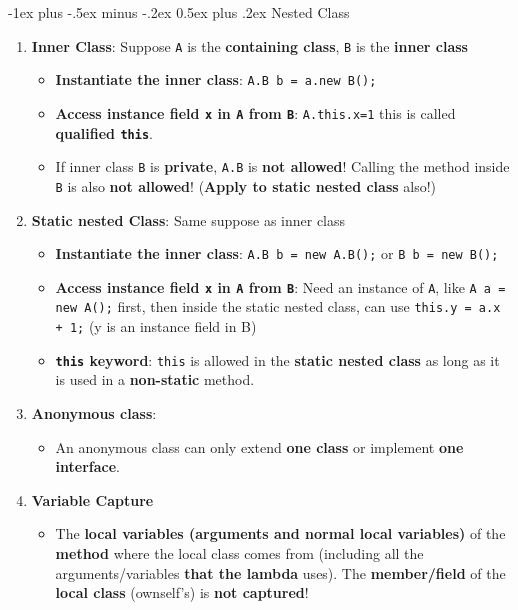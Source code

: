 \documentclass[10pt, landscape]{article}
\makeatletter
\renewcommand{\section}{\@startsection{section}{1}{0mm}%
                                {-1ex plus -.5ex minus -.2ex}%
                                {0.5ex plus .2ex}%
                                {\normalfont\large\bfseries}}
\makeatother
\begin{document}
\begin{multicols}{4}
\section{Nested Class}
\begin{enumerate}
    \item \textbf{Inner Class}: Suppose \texttt{A} is the \textbf{containing class}, \texttt{B} is the \textbf{inner class}
    \begin{itemize}
        \item \textbf{Instantiate the inner class}: \texttt{A.B b = a.new B();}
        \item \textbf{Access instance field \texttt{x} in \texttt{A} from \texttt{B}}: \texttt{A.this.x=1} this is called \textbf{qualified \texttt{this}}.
        \item If inner class \texttt{B} is \textbf{private}, \texttt{A.B} is \textbf{not allowed}! Calling the method inside \texttt{B} is also \textbf{not allowed}! (\textbf{Apply to static nested class} also!)
    \end{itemize}
    \item \textbf{Static nested Class}: Same suppose as inner class
    \begin{itemize}
        \item \textbf{Instantiate the inner class}: \texttt{A.B b = new A.B();} or \texttt{B b = new B();}
        \item \textbf{Access instance field \texttt{x} in \texttt{A} from \texttt{B}}: Need an instance of \texttt{A}, like \texttt{A a = new A();} first, then inside the static nested class, can use \texttt{this.y = a.x + 1;} (y is an instance field in B)
        \item \textbf{\texttt{this} keyword}: \texttt{this} is allowed in the \textbf{static nested class} as long as it is used in a \textbf{non-static} method.
    \end{itemize}
    \item \textbf{Anonymous class}:
    \begin{itemize}
        \item An anonymous class can only extend \textbf{one class} or implement \textbf{one interface}.
    \end{itemize}
    \item \textbf{Variable Capture}
    \begin{itemize}
        \item The \textbf{local variables (arguments and normal local variables)} of the \textbf{method} where the local class comes from (including all the arguments/variables \textbf{that the lambda} uses). The \textbf{member/field} of the \textbf{local class} (ownself's) is \textbf{not captured}!

\end{itemize}
\end{enumerate}
\end{multicols}
\end{document}
